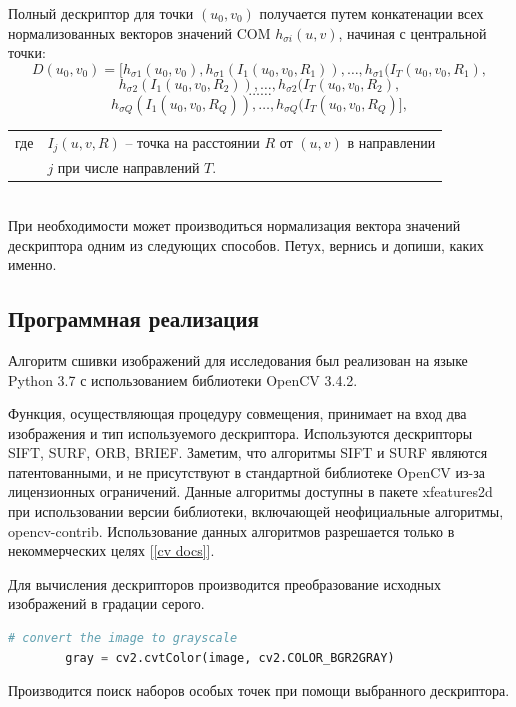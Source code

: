 {{{{		Полный дескриптор для точки $(u_0,v_0)$ получается путем конкатенации всех нормализованных векторов значений COM $h_{\sigma i}(u,v)$, начиная с центральной точки:
		$$D(u_0,v_0) = [h_{\sigma 1}(u_0, v_0), h_{\sigma 1}(I_1(u_0, v_0, R_1)), \dots, h_{\sigma 1}(I_T(u_0, v_0, R_1),$$ 
		$$h_{\sigma 2}(I_1(u_0, v_0, R_2)), \dots, h_{\sigma 2}(I_T(u_0, v_0, R_2),$$
		$$\dots \dots$$
		$$h_{\sigma Q}(I_1(u_0, v_0, R_Q)), \dots, h_{\sigma Q}(I_T(u_0, v_0, R_Q)],$$
		\begin{tabular}{ rl }
			\quad \quad где 
			& $I_j(u, v, R)$ -- точка на расстоянии $R$ от $(u, v)$ в направлении\\
			& $j$ при числе направлений $T$.
		\end{tabular}\\
		
		При необходимости может производиться нормализация вектора значений дескриптора одним из следующих способов. Петух, вернись и допиши, каких именно.
	
	}
	\newpage
   	\subsection{Программная реализация}{
   		
   		Алгоритм сшивки изображений для исследования был реализован на языке Python 3.7 с использованием библиотеки OpenCV 3.4.2. 
   		
   		Функция, осуществляющая процедуру совмещения, принимает на вход два изображения и тип используемого дескриптора. 
   		Используются дескрипторы SIFT, SURF, ORB, BRIEF. Заметим, что алгоритмы SIFT и SURF являются патентованными, и не присутствуют в стандартной библиотеке OpenCV из-за лицензионных ограничений. Данные алгоритмы доступны в пакете xfeatures2d при использовании версии библиотеки, включающей неофициальные алгоритмы, opencv-contrib. Использование данных алгоритмов разрешается только в некоммерческих целях [\ref{cv docs}]. 
   		
   		Для вычисления дескрипторов производится преобразование исходных изображений в градации серого.
   		
   		\begin{lstlisting}[frame=single,language=Python,mathescape=true] 
   		# convert the image to grayscale
   		gray = cv2.cvtColor(image, cv2.COLOR_BGR2GRAY)
   		\end{lstlisting}
   		
   		Производится поиск наборов особых точек при помощи выбранного дескриптора.
   	
}}}}
